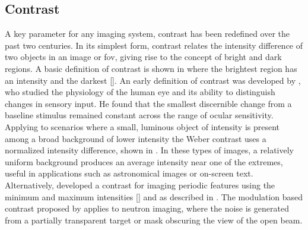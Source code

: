 \documentclass[../../../main.tex]{subfiles}%
\begin{document}
%
    \subsection{Contrast}%
    \label{sec:chapter-3:imaging-techniques:contrast}%
    A key parameter for any imaging system, contrast has been redefined over the past two centuries.
    In its simplest form, contrast relates the intensity difference of two objects in an image or \gls{fov}, giving rise to the concept of bright and dark regions. 
    A basic definition of contrast  is shown in  where the brightest region has an intensity  and the darkest [].
    An early definition of contrast was developed by \citeauthor*{book:Weber_1996}, who studied the physiology of the human eye and its ability to distinguish changes in sensory input. 
    He found that the smallest discernible change from a baseline stimulus remained constant across the range of ocular sensitivity.    
    Applying to scenarios where a small, luminous object of intensity is present among a broad background of lower intensity  the Weber contrast uses a normalized intensity difference, shown in  \cite{book:Weber_1996}.
    In these types of images, a relatively uniform background produces an average intensity near one of the extremes, useful in applications such as astronomical images or on-screen text.
    Alternatively, \citeauthor*{book:Michelson_1927} developed a contrast  for imaging periodic features using the minimum and maximum intensities [] and  as described in  \cite{book:Michelson_1927}.
    The modulation based contrast proposed by \citeauthor*{book:Michelson_1927} applies to neutron imaging, where the noise is generated from a partially transparent target or mask obscuring the view of the open beam.
\end{document}
